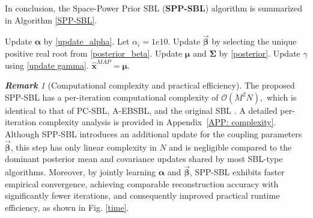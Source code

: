 \documentclass[lettersize,journal]{IEEEtran}
\theoremstyle{remark}
\newtheorem{remark}{\textbf{Remark}}
\begin{document}
In conclusion, the Space-Power Prior SBL (\textbf{SPP-SBL}) algorithm is summarized in Algorithm \ref{SPP-SBL}. 

\begin{algorithm}[t!] 
	\caption{SPP-SBL Algorithm} 		\label{SPP-SBL} 
		\begin{algorithmic}[1]
			\REPEAT
			\STATE Update $\boldsymbol{\alpha}$ by \eqref{update_alpha}. 
			\STATE Let $\alpha_i=1e10$.
			\COMMENT{\textcolor{gray}{\small Zero out small energy for efficiency.}}
			\ENDIF
			\STATE Update $\vec{\boldsymbol{\beta}}$ by selecting the unique positive real root from \eqref{posterior_beta}.
			\STATE Update $\boldsymbol{\mu}$ and $\boldsymbol{\Sigma}$ by \eqref{posterior}.
			\STATE Update $\gamma$ using \eqref{update gamma}.
			\STATE $\hat{\mathbf{x}}^{MAP}=\boldsymbol{\mu}$.
			\COMMENT{\textcolor{gray}{\small Use posterior mean as estimate.}}
		\end{algorithmic}
\end{algorithm}



\begin{remark}[Computational complexity and practical efficiency]
	The proposed SPP-SBL has a per-iteration computational complexity of
	$\mathcal{O}(M^2N),$ which is identical to that of PC-SBL, A-EBSBL, and the original SBL \cite{ji2008bayesian}. A detailed per-iteration complexity analysis is provided in Appendix~\ref{APP: complexity}. Although SPP-SBL introduces an additional update for the coupling parameters $\vec{\boldsymbol{\beta}}$, this step has only linear complexity in $N$ and is negligible compared to the dominant posterior mean and covariance updates shared by most SBL-type algorithms.
	Moreover, by jointly learning $\boldsymbol{\alpha}$ and $\vec{\boldsymbol{\beta}}$, SPP-SBL exhibits faster empirical convergence, achieving comparable reconstruction accuracy with significantly fewer iterations, and consequently improved practical runtime efficiency, as shown in Fig. \ref{time}.
\end{remark}
\end{document}
